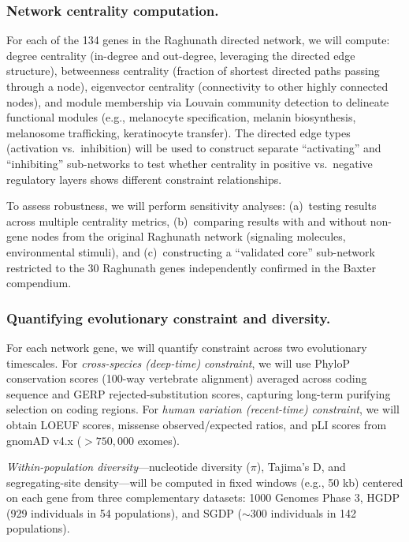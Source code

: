 \documentclass[11pt]{article}
\begin{document}
\subsubsection{Network centrality computation.}
For each of the 134 genes in the Raghunath directed network, we will compute: degree centrality (in-degree and out-degree, leveraging the directed edge structure), betweenness centrality (fraction of shortest directed paths passing through a node), eigenvector centrality (connectivity to other highly connected nodes), and module membership via Louvain community detection to delineate functional modules (e.g., melanocyte specification, melanin biosynthesis, melanosome trafficking, keratinocyte transfer). The directed edge types (activation vs.\ inhibition) will be used to construct separate ``activating'' and ``inhibiting'' sub-networks to test whether centrality in positive vs.\ negative regulatory layers shows different constraint relationships.

To assess robustness, we will perform sensitivity analyses: (a)~testing results across multiple centrality metrics, (b)~comparing results with and without non-gene nodes from the original Raghunath network (signaling molecules, environmental stimuli), and (c)~constructing a ``validated core'' sub-network restricted to the 30 Raghunath genes independently confirmed in the Baxter compendium.

\subsubsection{Quantifying evolutionary constraint and diversity.}
For each network gene, we will quantify constraint across two evolutionary timescales. For \emph{cross-species (deep-time) constraint}, we will use PhyloP conservation scores (100-way vertebrate alignment) averaged across coding sequence and GERP rejected-substitution scores, capturing long-term purifying selection on coding regions. For \emph{human variation (recent-time) constraint}, we will obtain LOEUF scores, missense observed/expected ratios, and pLI scores from gnomAD v4.x ($> 750{,}000$ exomes).

\emph{Within-population diversity}---nucleotide diversity ($\pi$), Tajima's D, and segregating-site density---will be computed in fixed windows (e.g., 50 kb) centered on each gene from three complementary datasets: 1000 Genomes Phase 3, HGDP (929 individuals in 54 populations), and SGDP ($\sim 300$ individuals in 142 populations).
\end{document}
